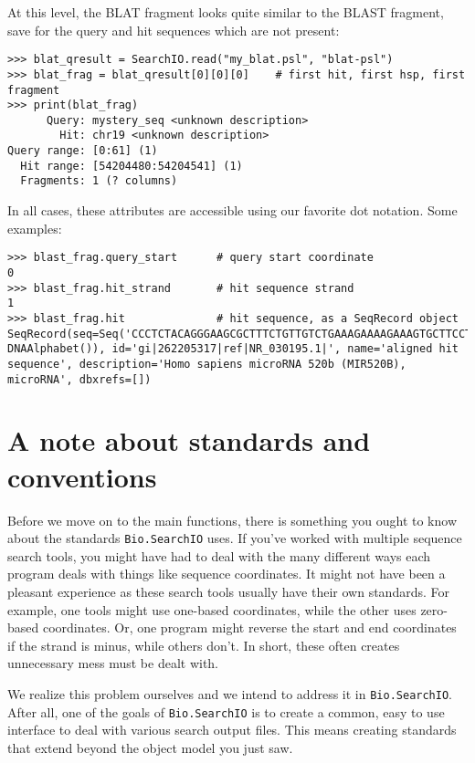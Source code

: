 At this level, the BLAT fragment looks quite similar to the BLAST fragment, save
for the query and hit sequences which are not present:

\begin{verbatim}
>>> blat_qresult = SearchIO.read("my_blat.psl", "blat-psl")
>>> blat_frag = blat_qresult[0][0][0]    # first hit, first hsp, first fragment
>>> print(blat_frag)
      Query: mystery_seq <unknown description>
        Hit: chr19 <unknown description>
Query range: [0:61] (1)
  Hit range: [54204480:54204541] (1)
  Fragments: 1 (? columns)
\end{verbatim}

In all cases, these attributes are accessible using our favorite dot notation.
Some examples:

\begin{verbatim}
>>> blast_frag.query_start      # query start coordinate
0
>>> blast_frag.hit_strand       # hit sequence strand
1
>>> blast_frag.hit              # hit sequence, as a SeqRecord object
SeqRecord(seq=Seq('CCCTCTACAGGGAAGCGCTTTCTGTTGTCTGAAAGAAAAGAAAGTGCTTCCTTT...GGG', DNAAlphabet()), id='gi|262205317|ref|NR_030195.1|', name='aligned hit sequence', description='Homo sapiens microRNA 520b (MIR520B), microRNA', dbxrefs=[])
\end{verbatim}

\section{A note about standards and conventions}
\label{sec:searchio-standards}

Before we move on to the main functions, there is something you ought to know
about the standards \verb|Bio.SearchIO| uses. If you've worked with multiple
sequence search tools, you might have had to deal with the many different ways
each program deals with things like sequence coordinates. It might not have been
a pleasant experience as these search tools usually have their own standards.
For example, one tools might use one-based coordinates, while the other uses
zero-based coordinates. Or, one program might reverse the start and end
coordinates if the strand is minus, while others don't. In short, these often
creates unnecessary mess must be dealt with.

We realize this problem ourselves and we intend to address it in
\verb|Bio.SearchIO|. After all, one of the goals of \verb|Bio.SearchIO| is to
create a common, easy to use interface to deal with various search output files.
This means creating standards that extend beyond the object model you just saw.

